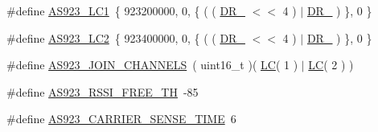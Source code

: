 \begin{DoxyCompactItemize}
\item 
\#define \hyperlink{group__REGIONAS923_gad552f8b259e81215d17bfd1f9c0f1198}{A\+S923\+\_\+\+L\+C1}~\{ 923200000, 0, \{ ( ( \hyperlink{group__REGION_ga872e12c82020c02a7f70a1c6ed1375df}{D\+R\+\_} $<$$<$ 4 ) $\vert$ \hyperlink{group__REGION_ga6c4ef966b4f3d5eb7597b087f2b97095}{D\+R\+\_} ) \}, 0 \}
\item 
\#define \hyperlink{group__REGIONAS923_gae6a0cfa9079c4ab3097ac797506452d4}{A\+S923\+\_\+\+L\+C2}~\{ 923400000, 0, \{ ( ( \hyperlink{group__REGION_ga872e12c82020c02a7f70a1c6ed1375df}{D\+R\+\_} $<$$<$ 4 ) $\vert$ \hyperlink{group__REGION_ga6c4ef966b4f3d5eb7597b087f2b97095}{D\+R\+\_} ) \}, 0 \}
\item 
\#define \hyperlink{group__REGIONAS923_ga56d14306ed1af83973ff240658721a24}{A\+S923\+\_\+\+J\+O\+I\+N\+\_\+\+C\+H\+A\+N\+N\+E\+LS}~( uint16\+\_\+t )( \hyperlink{group__REGION_ga12fa17e5c1016e01a9d82c25027deb1b}{LC}( 1 ) $\vert$ \hyperlink{group__REGION_ga12fa17e5c1016e01a9d82c25027deb1b}{LC}( 2 ) )
\item 
\#define \hyperlink{group__REGIONAS923_gabcc79c4eb4e2717692ac348885e3139f}{A\+S923\+\_\+\+R\+S\+S\+I\+\_\+\+F\+R\+E\+E\+\_\+\+TH}~-\/85
\item 
\#define \hyperlink{group__REGIONAS923_ga6c93e3596e26eb72247906ee33523404}{A\+S923\+\_\+\+C\+A\+R\+R\+I\+E\+R\+\_\+\+S\+E\+N\+S\+E\+\_\+\+T\+I\+ME}~6
\end{DoxyCompactItemize}

